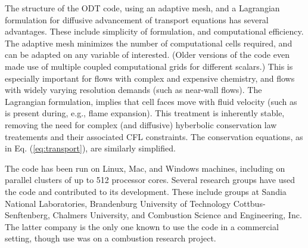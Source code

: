 \documentclass[preprint,12pt, a4paper]{elsarticle}
\begin{document}
The structure of the ODT code, using an adaptive mesh, and a Lagrangian formulation for diffusive advancement of transport equations has several advantages. These include simplicity of formulation, and computational efficiency. The adaptive mesh minimizes the number of computational cells required, and can be adapted on any variable of interested. (Older versions of the code even made use of multiple coupled computational grids for different scalars.) This is especially important for flows with complex and expensive chemistry, and flows with widely varying resolution demands (such as near-wall flows). The Lagrangian formulation, implies that cell faces move with fluid velocity (such as is present during, e.g., flame expansion). This treatment is inherently stable, removing the need for complex (and diffusive) hyberbolic conservation law treatements and their associated CFL constraints. The conservation equations, as in Eq. (\ref{eq:transport}), are similarly simplified.

The code has been run on Linux, Mac, and Windows machines, including on parallel clusters of up to 512 processor cores. Several research groups have used the code and contributed to its development. These include groups at Sandia National Laboratories, Brandenburg University of Technology Cottbus-Senftenberg, Chalmers University, and Combustion Science and Engineering, Inc. The latter company is the only one known to use the code in a commercial setting, though use was on a combustion research project. 
\end{document}
